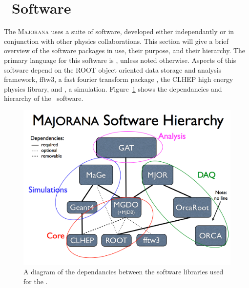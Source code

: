 \documentclass[/main.tex]{subfiles}
\begin{document}
\section{\MJD\ Software} \label{sec:mjsw}
The \textsc{Majorana} uses a suite of software, developed either independantly or in conjunction with other physics collaborations.
This section will give a brief overview of the software packages in use, their purpose, and their hierarchy.
The primary language for this software is \cpp, unless noted otherwise.
Aspects of this software depend on the ROOT object oriented data storage and analysis framework\cite{rootcern}, fftw3, a fast fourier transform package \cite{fftw3}, the CLHEP high energy physics library\cite{clhep}, and \geant, a simulation\cite{geant2003}.
Figure~\ref{fig:swhierarchy} shows the dependancies and hierarchy of the \MJD\ software.
\begin{figure}
  \centering
  \includegraphics[width=\textwidth]{SoftwareHierarchy}
  \caption[\MJD\ software hierarchy]{\label{fig:swhierarchy}
    A diagram of the dependancies between the software libraries used for the \MJD.
  }
\end{figure}
\end{document}
